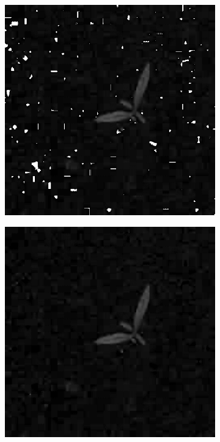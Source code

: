 \begin{figure}[H]
\begin{subfigure}[b]{0.3\textwidth}
        \caption{}
		\label{fig:seg_b}
    \end{subfigure}
    \begin{subfigure}[b]{0.3\textwidth}
        \centering
        \includegraphics[width=\textwidth]{./figure/result/segmentation/imgHSI1.png}
		\caption{}
		\label{fig:seg_c}
    \end{subfigure}
    \begin{subfigure}[b]{0.3\textwidth}
        \centering
        \includegraphics[width=\textwidth]{./figure/result/segmentation/imgHSIClean.png}

\end{subfigure}
\end{figure}
